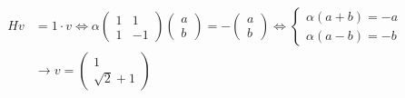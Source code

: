 \documentclass[12pt]{article}
\begin{document}

\begin{equation*}
\begin{aligned}
Hv & = 1 \cdot v \Leftrightarrow 
\alpha 
\begin{pmatrix}
1 & 1 \\ 
1 & -1 
\end{pmatrix}
\begin{pmatrix}
a \\ 
b 
\end{pmatrix}
=
- \begin{pmatrix}
a \\ 
b 
\end{pmatrix}
\Leftrightarrow 
\begin{cases}
\alpha (a + b) = -a \\
\alpha (a - b) = -b
\end{cases} \\
& \rightarrow
v = 
\begin{pmatrix}
1 \\ 
\sqrt{2} + 1 
\end{pmatrix}
\end{aligned}
\end{equation*}
\end{document}
